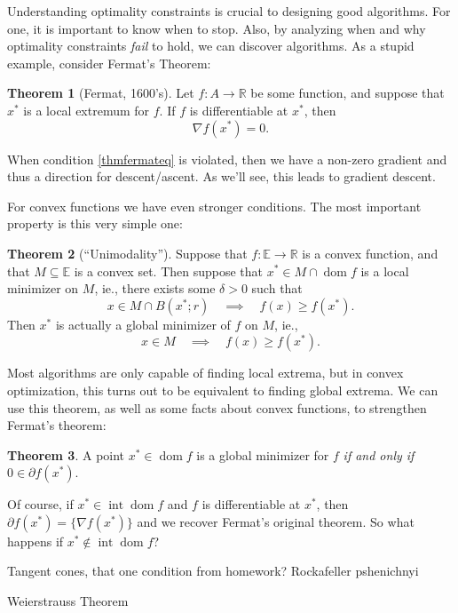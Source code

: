 \documentclass{article}
\numberwithin{equation}{section}
\theoremstyle{definition}
\newtheorem{theorem}{Theorem}[section]
\newcommand{\bE}{\mathbb{E}}
\newcommand{\bR}{\mathbb{R}}
\newcommand{\sint}{\operatorname{int}}
\newcommand{\dom}{\operatorname{dom}}
\begin{document}
Understanding optimality constraints is crucial to designing good algorithms. For one, it is important to know when to stop. Also, by analyzing when and why optimality constraints \textit{fail} to hold, we can discover algorithms. As a stupid example, consider Fermat's Theorem:
\begin{theorem}[Fermat, 1600's]
    Let $f:A\to\bR$ be some function, and suppose that $x^*$ is a local extremum for $f$. If $f$ is differentiable at $x^*$, then
    \begin{equation}\label{thmfermateq}\nabla f(x^*)=0.\end{equation}
\end{theorem}
When condition \ref{thmfermateq} is violated, then we have a non-zero gradient and thus a direction for descent/ascent. As we'll see, this leads to gradient descent.

For convex functions we have even stronger conditions. The most important property is this very simple one:
\begin{theorem}[``Unimodality'']
    Suppose that $f:\bE\to\bR$ is a convex function, and that $M\subseteq\bE$ is a convex set. Then suppose that $x^*\in M\cap\dom f$ is a local minimizer on $M$, ie., there exists some $\delta>0$ such that
    \begin{equation}
        x\in M\cap B(x^*;r)\quad\implies\quad f(x)\ge f(x^*).
    \end{equation}
    Then $x^*$ is actually a global minimizer of $f$ on $M$, ie.,
    \begin{equation}
        x\in M\quad\implies\quad f(x)\ge f(x^*).
    \end{equation}
\end{theorem}
Most algorithms are only capable of finding local extrema, but in convex optimization, this turns out to be equivalent to finding global extrema. We can use this theorem, as well as some facts about convex functions, to strengthen Fermat's theorem:
\begin{theorem}
    \label{thmfirstoptcondition}
    A point $x^*\in\dom f$ is a global minimizer for $f$ \textit{if and only if} $0\in\partial f(x^*)$.
\end{theorem}
Of course, if $x^*\in\sint\dom f$ and $f$ is differentiable at $x^*$, then $\partial f(x^*)=\{\nabla f(x^*)\}$ and we recover Fermat's original theorem. So what happens if $x^*\not\in\sint\dom f$?

Tangent cones, that one condition from homework? Rockafeller pshenichnyi

Weierstrauss Theorem    
\end{document}
